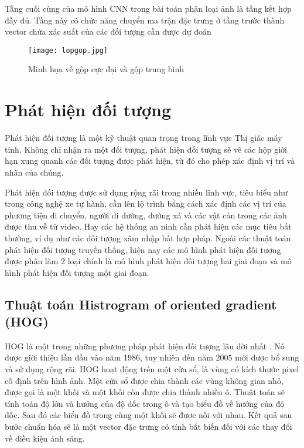 \documentclass[../the.tex]{subfiles}
\begin{document}
\bigskip

{\fontsize{13}{12} \selectfont

	Tầng cuối cùng của mô hình CNN trong bài toán phân loại ảnh là tầng kết hợp đầy đủ. Tầng này có chức năng chuyển ma trận đặc trưng ở tầng trước thành vector chứa xác suất của các đối tượng cần được dự đoán

}
\begin{figure}[H]
	\centering
	\texttt{[image: lopgop.jpg]}
	\caption{Minh họa về gộp cực đại và gộp trung bình}
	\label{fig:polling}
\end{figure}
\section{Phát hiện đối tượng}
 {\fontsize{13}{12} \selectfont

  Phát hiện đối tượng là một kỹ thuật quan trọng trong lĩnh vực Thị giác máy tính. Không chỉ nhận ra một đối tượng,
  phát hiện đối tượng sẽ vẽ các hộp giới hạn xung quanh các đối tượng được phát hiện, từ đó
  cho phép xác định vị trí và nhãn của chúng.

 }

\bigskip

{\fontsize{13}{12} \selectfont

	Phát hiện đối tượng được sử dụng rộng rãi trong nhiều lĩnh vực, tiêu biểu như trong công nghệ xe tự hành,
	cần lên lộ trình bằng cách xác định các vị trí của phương tiện di chuyển, người đi đường, đường xá và các vật cản trong các ảnh được thu về từ video. Hay các hệ thống an ninh cần phát hiện các mục tiêu bất thường, ví dụ như các đối tượng xâm nhập bất hợp pháp.
	Ngoài các thuật toán phát hiện đối tượng truyền thống, hiện nay các mô hình phát hiện đối tượng được phân làm 2 loại chính là mô hình phát hiện đối tượng hai giai đoạn và mô hình phát hiện đối tượng một giai đoạn.

}
\subsection{Thuật toán Histrogram of oriented gradient (HOG)}
{\fontsize{13}{12} \selectfont

	HOG là một trong những phương pháp phát hiện đối tượng lâu đời nhất \cite{dalal2005histograms}. Nó được giới thiệu lần đầu vào năm 1986,
	tuy nhiên đến năm 2005 mới được bổ sung và sử dụng rộng rãi. HOG hoạt động trên một cửa sổ, là vùng có kích thước pixel cố định trên hình ảnh. Một cửa sổ được chia thành các vùng không gian nhỏ, được gọi là một khối và một khối còn được chia thành nhiều ô.
	Thuật toán sẽ tính toán độ lớn và hướng của độ dốc trong ô và tạo biểu đồ về hướng của độ dốc. Sau đó các biểu đồ trong cùng một khối sẽ được nối với nhau.
	Kết quả sau bước chuẩn hóa sẽ là một vector đặc trưng có tính bất biến đối với các thay đổi về điều kiện ánh sáng.

}
\end{document}
